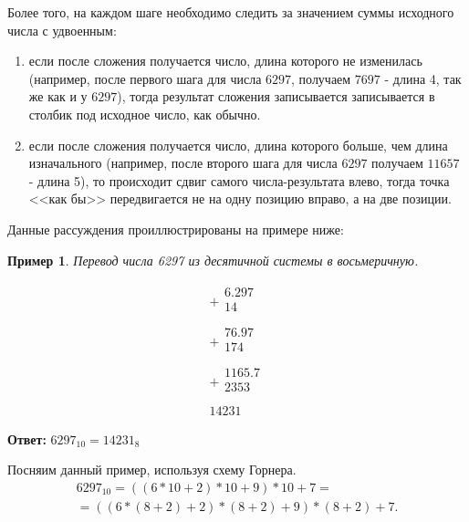 \documentclass[14pt, russian]{scrartcl}
\newcounter{cExample}
\newtheorem{Example}{Пример}[cExample]
\begin{document}
Более того, на каждом шаге необходимо следить за значением суммы исходного числа с удвоенным:
\begin{enumerate}
    \item если после сложения получается число, длина которого не изменилась (например, после первого шага для числа $6297$, получаем $7697$ - длина 4, так же как и у $6297$), тогда результат сложения записывается записывается в столбик под исходное число, как обычно.
    \item если после сложения получается число, длина которого больше, чем длина изначального (например, после второго шага для числа $6297$ получаем $11657$ - длина 5), то происходит сдвиг самого числа-результата влево, тогда точка <<как бы>> передвигается не на одну позицию вправо, а на две позиции.
\end{enumerate}

Данные рассуждения проиллюстрированы на примере ниже:


\begin{Example}\label{Example:MathFont18}
Перевод числа 6297 из десятичной системы в восьмеричную. 

$$
\begin{array}{r}
+
\begin{array}{r}
6.297\\
14\,\,\,\,\,\,\,\,\\
\end{array} \\
\hline
+
\begin{array}{r}
76.97\\
174\,\,\,\,\,\,\\
\end{array} \\
\hline
+
\begin{array}{r}
1165.7\\
2353\\
\end{array} \\
\hline
14231\,\,\,
\end{array}
$$
\end{Example} 
\textbf{Ответ:} $6297_{10} = 14231_8$ 

Посняим данный пример, используя схему Горнера.
\label{Example:MathFont19} 
\begin{equation*}\label{eq:19}
\begin{aligned}
6297_{10} = ((6*10 + 2)*10 +9)*10 + 7 = \\
= ((6*(8+2) + 2)*(8+2) +9)*(8+2) + 7.
\end{aligned}
\end{equation*}
\end{document}
